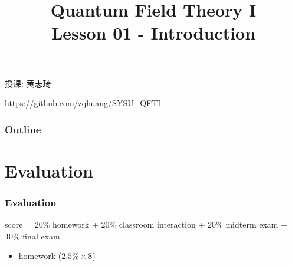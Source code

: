 \documentclass[CJK]{beamer}
\title{Quantum Field Theory I \\ Lesson 01 - Introduction}
\author{}
\date{}
\begin{document}
\begin{frame}
  \titlepage

\begin{center}
\bch
授课: 黄志琦
\ech
\end{center}

  \vskip 0.2in
https://github.com/zqhuang/SYSU\_QFTI
\end{frame}

\begin{frame}
\frametitle{Outline}
\tableofcontents
\end{frame}

\section{Evaluation}

\begin{frame}
\frametitle{Evaluation}
score = 20\% homework + 20\% classroom interaction + 20\% midterm exam + 40\% final exam
\begin{itemize}
\item[]{homework ($2.5\% \times 8 $)}
\end{itemize}
\end{frame}
\end{document}
